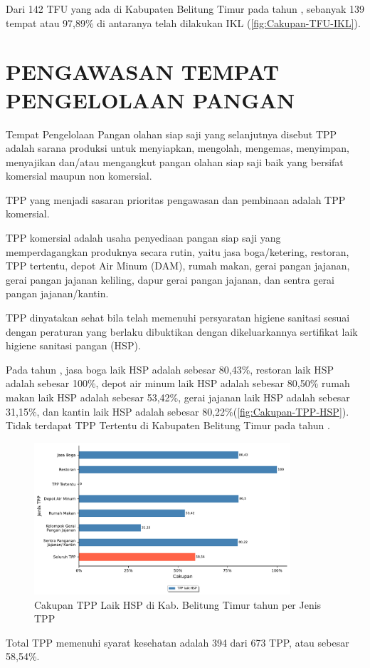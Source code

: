 Dari 142 TFU yang ada di Kabupaten Belitung Timur pada tahun \tP, sebanyak 139 tempat atau 97,89\% di antaranya telah dilakukan IKL (\autoref{fig:Cakupan-TFU-IKL}).

\section{PENGAWASAN TEMPAT PENGELOLAAN PANGAN}
Tempat Pengelolaan Pangan olahan siap saji yang selanjutnya disebut TPP adalah sarana produksi untuk menyiapkan, mengolah, mengemas, menyimpan, menyajikan dan/atau mengangkut pangan olahan siap saji baik yang bersifat komersial maupun non komersial.

TPP yang menjadi sasaran prioritas pengawasan dan pembinaan adalah TPP komersial.

TPP komersial adalah usaha penyediaan pangan siap saji yang memperdagangkan produknya secara rutin, yaitu jasa boga/ketering, restoran, TPP tertentu, depot Air Minum (DAM), rumah makan, gerai pangan jajanan, gerai pangan jajanan keliling, dapur gerai pangan jajanan, dan sentra gerai pangan jajanan/kantin.

TPP dinyatakan sehat bila telah memenuhi persyaratan higiene sanitasi sesuai dengan peraturan yang berlaku dibuktikan dengan dikeluarkannya sertifikat laik higiene sanitasi pangan (HSP).

Pada tahun \tP{}, jasa boga laik HSP adalah sebesar 80,43\%, restoran laik HSP adalah sebesar 100\%, depot air minum laik HSP adalah sebesar 80,50\% rumah makan laik HSP adalah sebesar 53,42\%, gerai jajanan laik HSP adalah sebesar 31,15\%, dan kantin laik HSP adalah sebesar 80,22\%(\autoref{fig:Cakupan-TPP-HSP}). Tidak terdapat TPP Tertentu di Kabupaten Belitung Timur pada tahun \tP .

\begin{figure}[H]
	\centering
	\includegraphics[width=0.85\textwidth]{bab_07/bab_07_05_TPPHSP}
	\caption{Cakupan TPP Laik HSP di Kab. Belitung Timur tahun \tP per Jenis TPP}
	\label{fig:Cakupan-TPP-HSP}
\end{figure}

Total TPP memenuhi syarat kesehatan adalah 394 dari 673 TPP, atau sebesar 58,54\%.